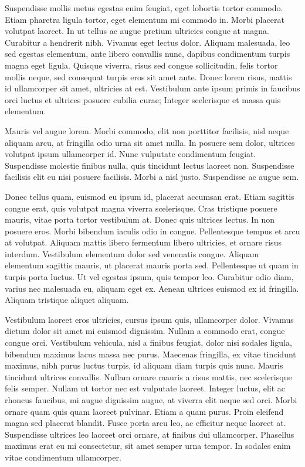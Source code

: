 Suspendisse mollis metus egestas enim feugiat, eget lobortis tortor commodo. Etiam pharetra ligula tortor, eget elementum mi commodo in. Morbi placerat volutpat laoreet. In ut tellus ac augue pretium ultricies congue at magna. Curabitur a hendrerit nibh. Vivamus eget lectus dolor. Aliquam malesuada, leo sed egestas elementum, ante libero convallis nunc, dapibus condimentum turpis magna eget ligula. Quisque viverra, risus sed congue sollicitudin, felis tortor mollis neque, sed consequat turpis eros sit amet ante. Donec lorem risus, mattis id ullamcorper sit amet, ultricies at est. Vestibulum ante ipsum primis in faucibus orci luctus et ultrices posuere cubilia curae; Integer scelerisque et massa quis elementum.

Mauris vel augue lorem. Morbi commodo, elit non porttitor facilisis, nisl neque aliquam arcu, at fringilla odio urna sit amet nulla. In posuere sem dolor, ultrices volutpat ipsum ullamcorper id. Nunc vulputate condimentum feugiat. Suspendisse molestie finibus nulla, quis tincidunt lectus laoreet non. Suspendisse facilisis elit eu nisi posuere facilisis. Morbi a nisl justo. Suspendisse ac augue sem.

Donec tellus quam, euismod eu ipsum id, placerat accumsan erat. Etiam sagittis congue erat, quis volutpat magna viverra scelerisque. Cras tristique posuere mauris, vitae porta tortor vestibulum at. Donec quis ultrices lectus. In non posuere eros. Morbi bibendum iaculis odio in congue. Pellentesque tempus et arcu at volutpat. Aliquam mattis libero fermentum libero ultricies, et ornare risus interdum. Vestibulum elementum dolor sed venenatis congue. Aliquam elementum sagittis mauris, ut placerat mauris porta sed. Pellentesque ut quam in turpis porta luctus. Ut vel egestas ipsum, quis tempor leo. Curabitur odio diam, varius nec malesuada eu, aliquam eget ex. Aenean ultrices euismod ex id fringilla. Aliquam tristique aliquet aliquam.

Vestibulum laoreet eros ultricies, cursus ipsum quis, ullamcorper dolor. Vivamus dictum dolor sit amet mi euismod dignissim. Nullam a commodo erat, congue congue orci. Vestibulum vehicula, nisl a finibus feugiat, dolor nisi sodales ligula, bibendum maximus lacus massa nec purus. Maecenas fringilla, ex vitae tincidunt maximus, nibh purus luctus turpis, id aliquam diam turpis quis nunc. Mauris tincidunt ultrices convallis. Nullam ornare mauris a risus mattis, nec scelerisque felis semper. Nullam ut tortor nec est vulputate laoreet. Integer luctus, elit ac rhoncus faucibus, mi augue dignissim augue, at viverra elit neque sed orci. Morbi ornare quam quis quam laoreet pulvinar. Etiam a quam purus. Proin eleifend magna sed placerat blandit. Fusce porta arcu leo, ac efficitur neque laoreet at. Suspendisse ultrices leo laoreet orci ornare, at finibus dui ullamcorper. Phasellus maximus erat eu mi consectetur, sit amet semper urna tempor. In sodales enim vitae condimentum ullamcorper.

